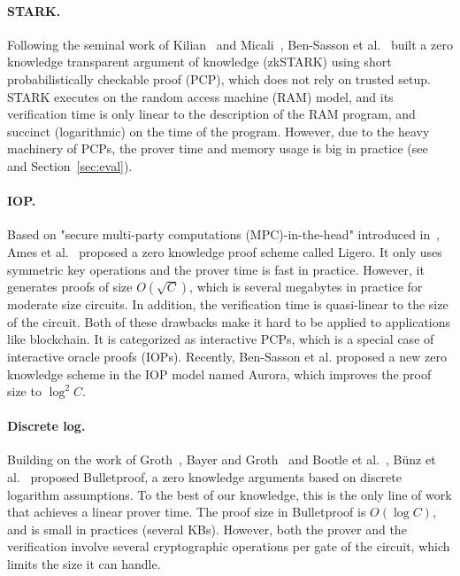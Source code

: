 \paragraph{STARK.} Following the seminal work of Kilian~\cite{Kilian92} and Micali~\cite{Micali00}, Ben-Sasson et al.~\cite{libstark} built a zero knowledge transparent argument of knowledge (zkSTARK) using short probabilistically checkable proof (PCP), which does not rely on trusted setup. STARK executes on the random access machine (RAM) model, and its verification time is only linear to the description of the RAM program, and succinct (logarithmic) on the time of the program.  However, due to the heavy machinery of PCPs, the prover time and memory usage is big in practice (see~\cite{hyrax} and Section~\ref{sec:eval}). 

\paragraph{IOP.} Based on "secure multi-party computations (MPC)-in-the-head" introduced in~\cite{ishai2007zero,giacomelli2016zkboo,chase2017post}, Ames et al.~\cite{ligero} proposed a zero knowledge proof scheme called Ligero. It only uses symmetric key operations and the prover time is fast in practice. However, it generates proofs of size $O(\sqrt{C})$, which is several megabytes in practice for moderate size circuits. In addition, the verification time is quasi-linear to the size of the circuit. Both of these drawbacks make it hard to be applied to applications like blockchain. It is categorized as interactive PCPs, which is a special case of interactive oracle proofs (IOPs). Recently, Ben-Sasson et al. proposed a new zero knowledge scheme in the IOP model named Aurora, which improves the proof size to $\log^2 C$.   

\paragraph{Discrete log.} Building on the work of Groth~\cite{groth2009linear}, Bayer and Groth~\cite{bayer2012efficient} and Bootle et al.~\cite{bootle2016efficient,bootle2017linear}, B{\"u}nz et al.~\cite{bulletproofs} proposed Bulletproof, a zero knowledge arguments based on discrete logarithm assumptions. To the best of our knowledge, this is the only line of work that achieves a linear prover time. The proof size in Bulletproof is $O(\log C)$, and is small in practices (several KBs). However, both the prover and the verification involve several cryptographic operations per gate of the circuit, which limits the size it can handle.

